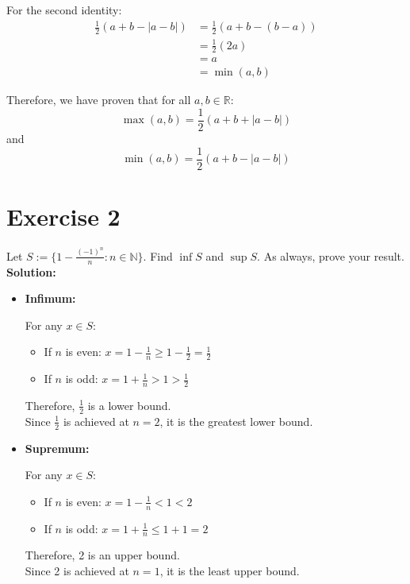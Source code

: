 \documentclass{article}
\begin{document}
For the second identity:
\begin{align*}
\frac{1}{2}(a + b - |a-b|) &= \frac{1}{2}(a + b - (b-a)) \\
&= \frac{1}{2}(2a) \\
&= a \\
&= \min(a,b)
\end{align*}

Therefore, we have proven that for all $a, b \in \mathbb{R}$:
\[\max(a,b) = \frac{1}{2}(a + b + |a-b|)\]
and
\[\min(a,b) = \frac{1}{2}(a + b - |a-b|)\]

\newpage

\section*{Exercise 2}
Let $S := \{1-\frac{(-1)^n}{n} : n \in \mathbb{N}\}$. Find $\inf S$ and $\sup S$. As always, prove your result. \\

\textbf{Solution:} \\

\begin{itemize}
   \item \textbf{Infimum:}

For any $x \in S$:
\begin{itemize}
    \item If $n$ is even: $x = 1-\frac{1}{n} \geq 1-\frac{1}{2} = \frac{1}{2}$
    \item If $n$ is odd: $x = 1+\frac{1}{n} > 1 > \frac{1}{2}$
\end{itemize}
Therefore, $\frac{1}{2}$ is a lower bound. \\

Since $\frac{1}{2}$ is achieved at $n=2$, it is the greatest lower bound. \\

\item \textbf{Supremum:}

For any $x \in S$:
\begin{itemize}
    \item If $n$ is even: $x = 1-\frac{1}{n} < 1 < 2$
    \item If $n$ is odd: $x = 1+\frac{1}{n} \leq 1+1 = 2$
\end{itemize}
Therefore, 2 is an upper bound. \\

Since 2 is achieved at $n=1$, it is the least upper bound.
\end{itemize}
\end{document}
